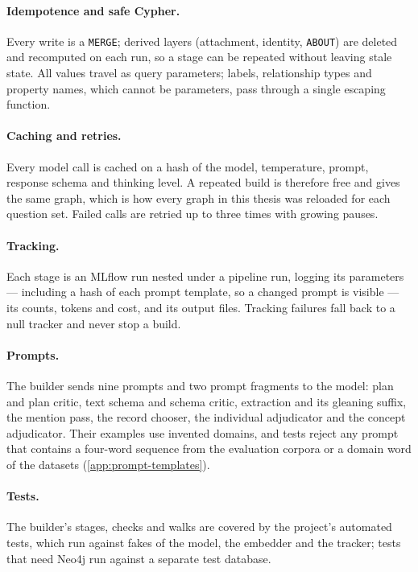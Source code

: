 \paragraph{Idempotence and safe Cypher.} Every write is a \texttt{MERGE}; derived layers (attachment, identity,
\texttt{ABOUT}) are deleted and recomputed on each run, so a stage can be repeated without leaving stale state.
All values travel as query parameters; labels, relationship types and property names, which cannot be parameters,
pass through a single escaping function.

\paragraph{Caching and retries.} Every model call is cached on a hash of the model, temperature, prompt, response
schema and thinking level. A repeated build is therefore free and gives the same graph, which is how every graph
in this thesis was reloaded for each question set. Failed calls are retried up to three times with growing pauses.

\paragraph{Tracking.} Each stage is an MLflow run nested under a pipeline run, logging its parameters --- including
a hash of each prompt template, so a changed prompt is visible --- its counts, tokens and cost, and its output files.
Tracking failures fall back to a null tracker and never stop a build.

\paragraph{Prompts.} The builder sends nine prompts and two prompt fragments to the model: plan and plan critic,
text schema and schema critic, extraction and its gleaning suffix, the mention pass, the record chooser, the
individual adjudicator and the concept adjudicator. Their examples use invented domains, and tests reject any
prompt that contains a four-word sequence from the evaluation corpora or a domain word of the datasets
(\cref{app:prompt-templates}).

\paragraph{Tests.} The builder's stages, checks and walks are covered by the project's automated tests, which run
against fakes of the model, the embedder and the tracker; tests that need Neo4j run against a separate test
database.

